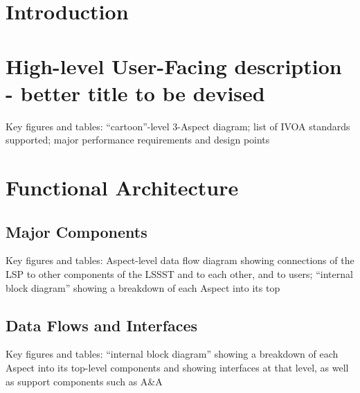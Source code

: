 \section{Introduction}

\section{High-level User-Facing description - better title to be devised}


Key figures and tables: ``cartoon''-level 3-Aspect diagram; list of IVOA standards supported; major performance requirements and design points

\section{Functional Architecture}


\subsection{Major Components}

Key figures and tables: Aspect-level data flow diagram showing connections of the LSP to other components of the LSSST and to each other, and to users; ``internal block diagram'' showing a breakdown of each Aspect into its top

\subsection{Data Flows and Interfaces}


Key figures and tables: ``internal block diagram'' showing a breakdown of each Aspect into its top-level components and showing interfaces at that level, as well as support components such as A&A

